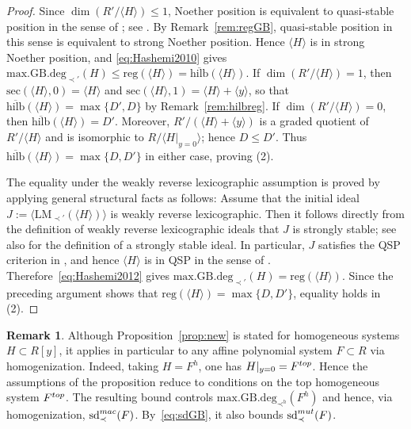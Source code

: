 \documentclass{article}
\theoremstyle{definition}
\newtheorem{remark}[theorem]{Remark}
\theoremstyle{plain}
\theoremstyle{plain}
\theoremstyle{plain}
\theoremstyle{plain}
\numberwithin{equation}{subsection}
\begin{document}
\begin{proof}
Since $\dim(R'/\langle H\rangle)\leq1$, Noether position is equivalent to quasi-stable position in the sense of \cite{HSS18}; see \cite[the paragraph following Proposition~5.7]{HS}.
By Remark~\ref{rem:regGB}, quasi-stable position in this sense is equivalent to strong Noether position.
Hence $\langle H\rangle$ is in strong Noether position, and
\eqref{eq:Hashemi2010} gives $\mathrm{max.GB.deg}_{\prec'}(H) \leq\mathrm{reg}(\langle H\rangle)=\overline{\mathrm{hilb}}(\langle H\rangle)$.
If $\dim(R'/\langle H\rangle)=1$, then $\mathrm{sec}(\langle H\rangle,0)=\langle H\rangle$ and $\mathrm{sec}(\langle H\rangle,1)=\langle H\rangle+\langle y\rangle$, so that $\overline{\mathrm{hilb}}(\langle H \rangle)=\max\{D',D\}$ by Remark~\ref{rem:hilbreg}.
If $\dim(R'/\langle H\rangle)=0$, then $\overline{\mathrm{hilb}}(\langle H \rangle)=D'$.
Moreover, $R'/(\langle H\rangle+\langle y\rangle)$ is a graded quotient of $R'/\langle H\rangle$ and is isomorphic to $R/\langle H|_{y=0}\rangle$; hence $D\leq D'$.
Thus $\overline{\mathrm{hilb}}(\langle H \rangle)=\max\{D,D'\}$ in either case, proving {\rm (2)}.

The equality under the weakly reverse lexicographic assumption is proved by applying general structural facts as follows:
Assume that the initial ideal $J:=\langle \mathrm{LM}_{\prec'}(\langle H\rangle)\rangle$ is weakly reverse lexicographic.
Then it follows directly from the definition of weakly reverse lexicographic ideals that $J$ is strongly stable; see also \cite[Definition 3.1 (iii)]{HSS18} for the definition of a strongly stable ideal.
In particular, $J$ satisfies the QSP criterion in \cite[Corollary~3.1]{Hashemi2012}, and hence $\langle H \rangle$ is in QSP in the sense of \cite{Hashemi2012}.
Therefore~\eqref{eq:Hashemi2012} gives $\mathrm{max.GB.deg}_{\prec'}(H)=\mathrm{reg}(\langle H \rangle)$.
Since the preceding argument shows that $\mathrm{reg}(\langle H \rangle)=\max\{D,D'\}$, equality holds in {\rm (2)}.
\end{proof}

\begin{remark}
Although Proposition~\ref{prop:new} is stated for homogeneous systems $H\subset R[y]$, it applies in particular to any affine polynomial system $F\subset R$ via homogenization.
Indeed, taking $H=F^h$, one has $H|_{y=0}=F^{\rm top}$.
Hence the assumptions of the proposition reduce to conditions on the top homogeneous system $F^{\rm top}$.
The resulting bound controls $\mathrm{max.GB.deg}_{\prec^h}(F^h)$ and hence, via homogenization, $\mathrm{sd}_{\prec}^{\rm mac}(F)$.
By~\eqref{eq:sdGB}, it also bounds $\mathrm{sd}_{\prec}^{\rm mut}(F)$.
\end{remark}
\end{document}
